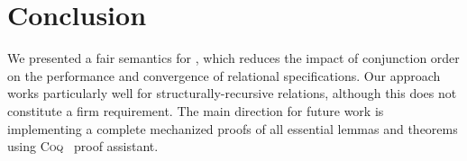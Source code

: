 \section{Conclusion}
\label{sec:conclusion}

We presented a fair semantics for \mk, which reduces the impact of conjunction order on the performance and convergence of relational specifications. Our approach
works particularly well for structurally-recursive relations, although this does not constitute a firm requirement.
The main direction for future work is implementing a complete mechanized proofs of all essential lemmas and theorems using \textsc{Coq}~\cite{fair:Coq} proof assistant.
